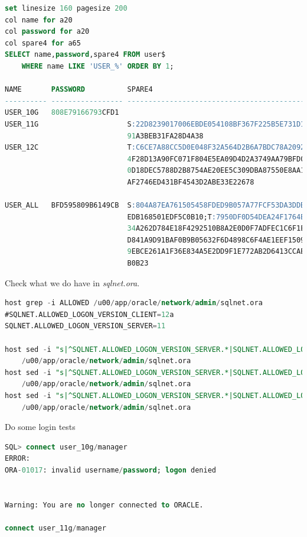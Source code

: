 \documentclass[a4paper,,tablecaptionabove]{scrartcl}
\begin{document}
\begin{lstlisting}[language=SQL]
set linesize 160 pagesize 200
col name for a20
col password for a20
col spare4 for a65
SELECT name,password,spare4 FROM user$ 
    WHERE name LIKE 'USER_%' ORDER BY 1;

NAME       PASSWORD          SPARE4
---------- ----------------- --------------------------------------------
USER_10G   808E79166793CFD1
USER_11G                     S:22D8239017006EBDE054108BF367F225B5E731D12C
                             91A3BEB31FA28D4A38
USER_12C                     T:C6CE7A88CC5D0E048F32A564D2B6A7BDC78A209218
                             4F28D13A90FC071F804E5EA09D4D2A3749AA79BFD0A9
                             0D18DEC5788D2B8754AE20EE5C309DBA87550E8AA15E
                             AF2746ED431BF4543D2ABE33E22678

USER_ALL   BFD595809B6149CB  S:804A87EA761505458FDED9B057A77FCF53DA3DDBD6
                             EDB168501EDF5C0B10;T:7950DF0D54DEA24F1764EBC
                             34A262D784E18F4292510B8A2E0D0F7ADFEC1C6F1E22
                             D841A9D91BAF0B9B05632F6D4898C6F4AE1EEF150933
                             9EBCE261A1F36E834A5E2DD9F1E772AB2D6413CCAB5E
                             B0B23
\end{lstlisting}

Check what we do have in \emph{sqlnet.ora}.

\begin{lstlisting}[language=SQL]
host grep -i ALLOWED /u00/app/oracle/network/admin/sqlnet.ora
#SQLNET.ALLOWED_LOGON_VERSION_CLIENT=12a
SQLNET.ALLOWED_LOGON_VERSION_SERVER=11

host sed -i "s|^SQLNET.ALLOWED_LOGON_VERSION_SERVER.*|SQLNET.ALLOWED_LOGON_VERSION_SERVER=11|" \
    /u00/app/oracle/network/admin/sqlnet.ora
host sed -i "s|^SQLNET.ALLOWED_LOGON_VERSION_SERVER.*|SQLNET.ALLOWED_LOGON_VERSION_SERVER=12|" \
    /u00/app/oracle/network/admin/sqlnet.ora
host sed -i "s|^SQLNET.ALLOWED_LOGON_VERSION_SERVER.*|SQLNET.ALLOWED_LOGON_VERSION_SERVER=12a|" \
    /u00/app/oracle/network/admin/sqlnet.ora
\end{lstlisting}

Do some login tests

\begin{lstlisting}[language=SQL]
SQL> connect user_10g/manager
ERROR:
ORA-01017: invalid username/password; logon denied


Warning: You are no longer connected to ORACLE.

connect user_11g/manager
\end{lstlisting}
\end{document}
